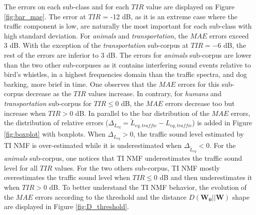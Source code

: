 \documentclass[12pt,english,twoside]{article}
\begin{document}
The errors on each sub-class and for each $TIR$ value are displayed on Figure \ref{fig:bar_mae}.
The error at $TIR$ = -12 dB, as it is an extreme case where the traffic component is low, are naturally the most important for each sub-class with high standard deviation. For \textit{animals} and \textit{transportation}, the $MAE$ errors exceed 3 dB. With the exception of the \textit{transportation} sub-corpus at $TIR = -6$ dB, the rest of the errors are inferior to 3 dB.
The errors for \textit{animals} sub-corpus are lower than the two other sub-corpuses as it contains interfering sound events relative to bird's whistles, in a highest frequencies domain than the traffic spectra, and dog barking, more brief in time.
One observes that the $MAE$ errors for this sub-corpus decrease as the $TIR$ values increase. In contrary, for \textit{humans} and \textit{transportation} sub-corpus for $TIR \leq 0$ dB, the $MAE$ errors decrease too but increase when $TIR > 0$ dB.
In parallel to the bar distribution of the $MAE$ errors, the distribution of relative errors ($\Delta_{L_{eq}} = \tilde{L}_{eq,traffic}-L_{eq,traffic}$) is added in Figure \ref{fig:boxplot} with boxplots. When $\Delta_{L_{eq}} > 0$, the traffic sound level estimated by TI NMF is over-estimated while it is underestimated when $\Delta_{\tilde{L}_{eq}} < 0$. 
For the \textit{animals} sub-corpus, one notices that TI NMF underestimates the traffic sound level for all $TIR$ values. For the two others sub-corpus, TI NMF mostly  overestimates the traffic sound level when $TIR \leq 0$ dB and then underestimates it when $TIR > 0$ dB.
To better understand the TI NMF behavior, the evolution of the $MAE$ errors according to the threshold and the distance $D(\mathbf{W_0}\vert \vert \mathbf{W})$ shape are displayed in Figure \ref{fig:D_threshold}.
\end{document}
